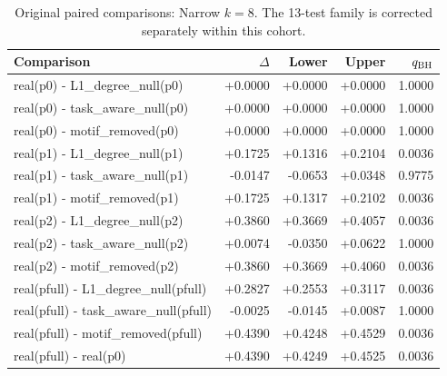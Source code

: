 \begin{table}[H]\centering
\caption{Original paired comparisons: Narrow $k=8$. The 13-test family is corrected separately within this cohort.}\small
\begin{tabular}{lrrrr}\toprule
Comparison & $\Delta$ & Lower & Upper & $q_{\rm BH}$ \\ \midrule
real(p0) - L1\_degree\_null(p0) & +0.0000 & +0.0000 & +0.0000 & 1.0000 \\
real(p0) - task\_aware\_null(p0) & +0.0000 & +0.0000 & +0.0000 & 1.0000 \\
real(p0) - motif\_removed(p0) & +0.0000 & +0.0000 & +0.0000 & 1.0000 \\
real(p1) - L1\_degree\_null(p1) & +0.1725 & +0.1316 & +0.2104 & 0.0036 \\
real(p1) - task\_aware\_null(p1) & -0.0147 & -0.0653 & +0.0348 & 0.9775 \\
real(p1) - motif\_removed(p1) & +0.1725 & +0.1317 & +0.2102 & 0.0036 \\
real(p2) - L1\_degree\_null(p2) & +0.3860 & +0.3669 & +0.4057 & 0.0036 \\
real(p2) - task\_aware\_null(p2) & +0.0074 & -0.0350 & +0.0622 & 1.0000 \\
real(p2) - motif\_removed(p2) & +0.3860 & +0.3669 & +0.4060 & 0.0036 \\
real(pfull) - L1\_degree\_null(pfull) & +0.2827 & +0.2553 & +0.3117 & 0.0036 \\
real(pfull) - task\_aware\_null(pfull) & -0.0025 & -0.0145 & +0.0087 & 1.0000 \\
real(pfull) - motif\_removed(pfull) & +0.4390 & +0.4248 & +0.4529 & 0.0036 \\
real(pfull) - real(p0) & +0.4390 & +0.4249 & +0.4525 & 0.0036 \\
\bottomrule\end{tabular}\end{table}